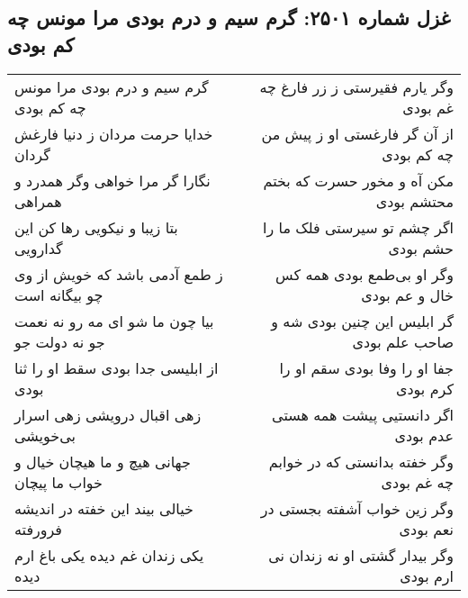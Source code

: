 \begin{center}
\section*{غزل شماره ۲۵۰۱: گرم سیم و درم بودی مرا مونس چه کم بودی}
\label{sec:2501}
\begin{longtable}{l p{0.5cm} r}
گرم سیم و درم بودی مرا مونس چه کم بودی
&&
وگر یارم فقیرستی ز زر فارغ چه غم بودی
\\
خدایا حرمت مردان ز دنیا فارغش گردان
&&
از آن گر فارغستی او ز پیش من چه کم بودی
\\
نگارا گر مرا خواهی وگر همدرد و همراهی
&&
مکن آه و مخور حسرت که بختم محتشم بودی
\\
بتا زیبا و نیکویی رها کن این گدارویی
&&
اگر چشم تو سیرستی فلک ما را حشم بودی
\\
ز طمع آدمی باشد که خویش از وی چو بیگانه است
&&
وگر او بی‌طمع بودی همه کس خال و عم بودی
\\
بیا چون ما شو ای مه رو نه نعمت جو نه دولت جو
&&
گر ابلیس این چنین بودی شه و صاحب علم بودی
\\
از ابلیسی جدا بودی سقط او را ثنا بودی
&&
جفا او را وفا بودی سقم او را کرم بودی
\\
زهی اقبال درویشی زهی اسرار بی‌خویشی
&&
اگر دانستیی پیشت همه هستی عدم بودی
\\
جهانی هیچ و ما هیچان خیال و خواب ما پیچان
&&
وگر خفته بدانستی که در خوابم چه غم بودی
\\
خیالی بیند این خفته در اندیشه فرورفته
&&
وگر زین خواب آشفته بجستی در نعم بودی
\\
یکی زندان غم دیده یکی باغ ارم دیده
&&
وگر بیدار گشتی او نه زندان نی ارم بودی
\\
\end{longtable}
\end{center}
